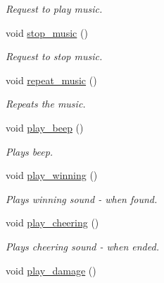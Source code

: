 \begin{DoxyCompactItemize}
\begin{DoxyCompactList}\small\item\em Request to play music. \end{DoxyCompactList}\item 
\hypertarget{class_game_state_a9c36bb4564fab5d057f7aa6c78983492}{void \hyperlink{class_game_state_a9c36bb4564fab5d057f7aa6c78983492}{stop\-\_\-music} ()}\label{class_game_state_a9c36bb4564fab5d057f7aa6c78983492}

\begin{DoxyCompactList}\small\item\em Request to stop music. \end{DoxyCompactList}\item 
\hypertarget{class_game_state_a0b8627fb9e37a4303b0bb15314e355de}{void \hyperlink{class_game_state_a0b8627fb9e37a4303b0bb15314e355de}{repeat\-\_\-music} ()}\label{class_game_state_a0b8627fb9e37a4303b0bb15314e355de}

\begin{DoxyCompactList}\small\item\em Repeats the music. \end{DoxyCompactList}\item 
\hypertarget{class_game_state_a5b34c8cbd60e8f466a1e0a20b021a85a}{void \hyperlink{class_game_state_a5b34c8cbd60e8f466a1e0a20b021a85a}{play\-\_\-beep} ()}\label{class_game_state_a5b34c8cbd60e8f466a1e0a20b021a85a}

\begin{DoxyCompactList}\small\item\em Plays beep. \end{DoxyCompactList}\item 
\hypertarget{class_game_state_a184b4dfd1ddf2454a882bf1566f74d11}{void \hyperlink{class_game_state_a184b4dfd1ddf2454a882bf1566f74d11}{play\-\_\-winning} ()}\label{class_game_state_a184b4dfd1ddf2454a882bf1566f74d11}

\begin{DoxyCompactList}\small\item\em Plays winning sound -\/ when found. \end{DoxyCompactList}\item 
\hypertarget{class_game_state_a54cbdd220dbbbc0a1e60f7cd3abab00d}{void \hyperlink{class_game_state_a54cbdd220dbbbc0a1e60f7cd3abab00d}{play\-\_\-cheering} ()}\label{class_game_state_a54cbdd220dbbbc0a1e60f7cd3abab00d}

\begin{DoxyCompactList}\small\item\em Plays cheering sound -\/ when ended. \end{DoxyCompactList}\item 
\hypertarget{class_game_state_a405343ad0fe2b6a376ce23b3e87c1840}{void \hyperlink{class_game_state_a405343ad0fe2b6a376ce23b3e87c1840}{play\-\_\-damage} ()}\label{class_game_state_a405343ad0fe2b6a376ce23b3e87c1840}


\end{DoxyCompactItemize}
